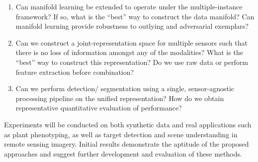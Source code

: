 \begin{enumerate}
	\item Can manifold learning be extended to operate under the multiple-instance framework? If so, what is the ``best'' way to construct the data manifold?  Can manifold learning provide robustness to outlying and adversarial exemplars?
	\item Can we construct a joint-representation space for multiple sensors such that there is no loss of information amongst any of the modalities?  What is the ``best'' way to construct this representation?  Do we use raw data or perform feature extraction before combination?
	\item Can we perform detection/ segmentation using a single, sensor-agnostic processing pipeline on the unified representation?  How do we obtain representative quantitative evaluation of performance?
\end{enumerate} 

Experiments will be conducted on both synthetic data and real applications such as plant phenotyping, as well as target detection and scene understanding in remote sensing imagery. Initial results demonstrate the aptitude of the proposed approaches and suggest further development and evaluation of these methods.


